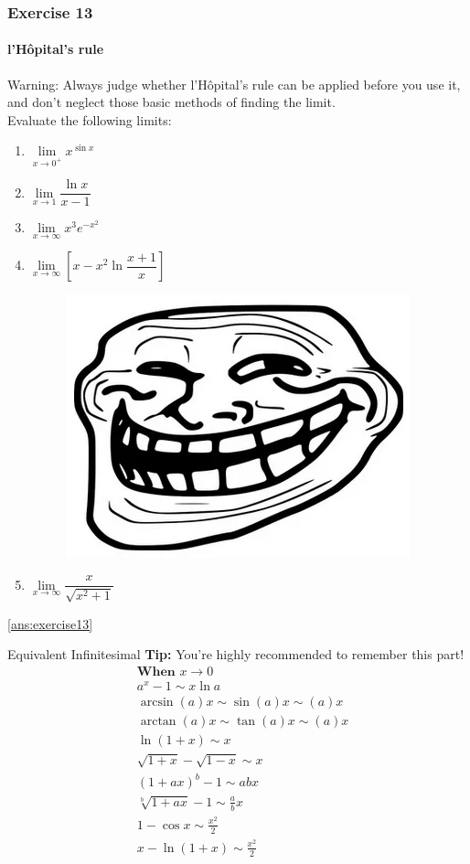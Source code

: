 \begin{frame}
	\frametitle{Exercise 13}
	\framesubtitle{l'Hôpital's rule}
	\alert{Warning}: Always judge whether l'Hôpital's rule can be applied before you use it, and \alert{don't neglect those basic methods of finding the limit}.\\
	\bigskip
	Evaluate the following limits:
	\begin{enumerate}
		\item $\lim\limits_{\textit{x} \to 0^{+}}x^{\sin{x}}$
		\item $\lim\limits_{\textit{x} \to 1}\dfrac{\ln x}{x-1}$
		\item $\lim\limits_{\textit{x} \to \infty}x^{3}e^{-x^{2}}$
		\item $\lim\limits_{\textit{x} \to \infty}[x - x^{2}\ln{\dfrac{x + 1}{x}}]$\\
		      \begin{figure}
			      \includegraphics[width=0.1\linewidth]{res/troll.png}
		      \end{figure}
		\item \begin{center}
			      $\lim\limits_{\textit{x} \to \infty}\dfrac{x}{\sqrt{x^{2} + 1}}$
		      \end{center}
	\end{enumerate}
	\ref{ans:exercise13}
\end{frame}



\begin{frame}{Equivalent Infinitesimal}
	\textbf{Tip:} You're highly recommended to remember this part!
	$$
		\begin{aligned}
			 & \textbf{When } x \rightarrow 0          \\
			 & a^{x}-1 \sim x \ln a                    \\
			 & \arcsin (a) x \sim \sin (a) x \sim(a) x \\
			 & \arctan (a) x \sim \tan (a) x \sim(a) x \\
			 & \ln (1+x) \sim x                        \\
			 & \sqrt{1+x}-\sqrt{1-x} \sim x            \\
			 & (1+a x)^{b}-1 \sim a b x                \\
			 & \sqrt[b]{1+a x}-1 \sim \frac{a}{b} x    \\
			 & 1-\cos x \sim \frac{x^{2}}{2}           \\
			 & x-\ln (1+x) \sim \frac{x^{2}}{2}        \\
		\end{aligned}
	$$
\end{frame}


